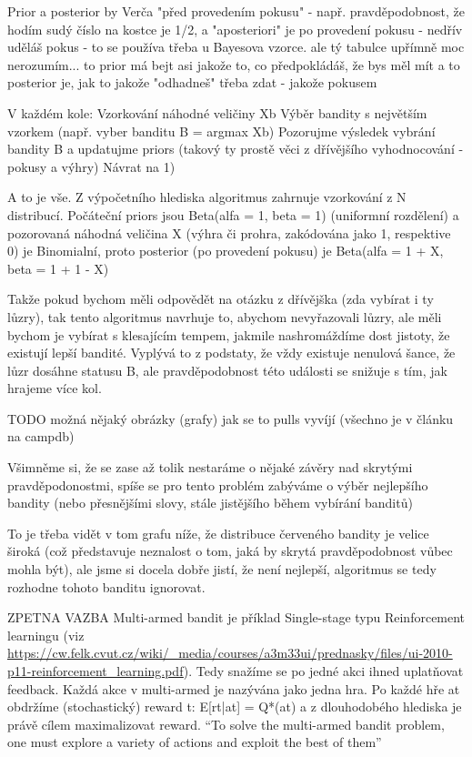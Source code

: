 \documentclass[thesis=M,czech]{FITthesis}[2014/05/07]
\begin{document}
Prior a posterior by Verča
"před provedením pokusu" - např. pravděpodobnost, že hodím sudý číslo na kostce je 1/2, a "aposteriori" je po provedení pokusu - nedřív uděláš pokus - to se používa třeba u Bayesova vzorce. ale tý tabulce upřímně moc nerozumím... to prior má bejt asi jakože to, co předpokládáš, že bys měl mít a to posterior je, jak to jakože "odhadneš" třeba  zdat - jakože pokusem

V každém kole:
Vzorkování náhodné veličiny Xb 
Výběr bandity s největším vzorkem (např. vyber banditu B = argmax Xb)
Pozorujme výsledek vybrání bandity B a updatujme priors (takový ty prostě věci z dřívějšího vyhodnocování - pokusy a výhry)
Návrat na 1)

A to je vše. Z výpočetního hlediska algoritmus zahrnuje vzorkování z N distribucí. Počáteční priors jsou Beta(alfa = 1, beta = 1) (uniformní rozdělení) a pozorovaná náhodná veličina X (výhra či prohra, zakódována jako 1, respektive 0) je Binomialní, proto posterior (po provedení pokusu) je Beta(alfa = 1 + X, beta = 1 + 1 - X)

Takže pokud bychom měli odpovědět na otázku z dřívějška (zda vybírat i ty lůzry), tak tento algoritmus navrhuje to, abychom nevyřazovali lůzry, ale měli bychom je vybírat s klesajícím tempem, jakmile nashromáždíme dost jistoty, že existují lepší bandité. Vyplývá to z podstaty, že vždy existuje nenulová šance, že lůzr dosáhne statusu B, ale pravděpodobnost této události se snižuje s tím, jak hrajeme více kol. 

TODO možná nějaký obrázky (grafy) jak se to pulls vyvíjí (všechno je v článku na campdb)

Všimněme si, že se zase až tolik nestaráme o nějaké závěry nad skrytými pravděpodonostmi, spíše se pro tento problém zabýváme o výběr nejlepšího bandity (nebo přesnějšími slovy, stále jistějšího během vybírání banditů)

To je třeba vidět v tom grafu níže, že distribuce červeného bandity je velice široká (což představuje neznalost o tom, jaká by skrytá pravděpodobnost vůbec mohla být), ale jsme si docela dobře jistí, že není nejlepší, algoritmus se tedy rozhodne tohoto banditu ignorovat.

ZPETNA VAZBA
Multi-armed bandit je příklad Single-stage typu Reinforcement learningu (viz \url{https://cw.felk.cvut.cz/wiki/_media/courses/a3m33ui/prednasky/files/ui-2010-p11-reinforcement_learning.pdf}). Tedy snažíme se po jedné akci ihned uplatňovat feedback. Každá akce v multi-armed je nazývána jako jedna hra. Po každé hře at obdržíme (stochastický) reward t:
E[rt|at] = Q*(at) a z dlouhodobého hlediska je právě cílem maximalizovat reward.
“To solve the multi-armed bandit problem, one must explore a variety of
actions and exploit the best of them”
\end{document}
